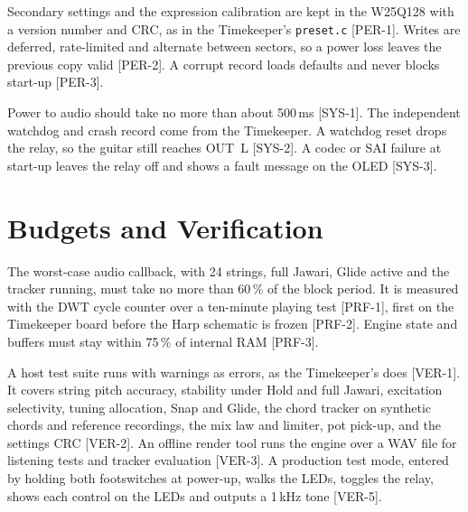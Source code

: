 Secondary settings and the expression calibration are kept in the W25Q128 with a version number and CRC, as in the Timekeeper's \texttt{preset.c} [PER-1]. Writes are deferred, rate-limited and alternate between sectors, so a power loss leaves the previous copy valid [PER-2]. A corrupt record loads defaults and never blocks start-up [PER-3].

Power to audio should take no more than about 500\,ms [SYS-1]. The independent watchdog and crash record come from the Timekeeper. A watchdog reset drops the relay, so the guitar still reaches OUT~L [SYS-2]. A codec or SAI failure at start-up leaves the relay off and shows a fault message on the OLED [SYS-3].

\section{Budgets and Verification}
The worst-case audio callback, with 24 strings, full Jawari, Glide active and the tracker running, must take no more than 60\,\% of the block period. It is measured with the DWT cycle counter over a ten-minute playing test [PRF-1], first on the Timekeeper board before the Harp schematic is frozen [PRF-2]. Engine state and buffers must stay within 75\,\% of internal RAM [PRF-3].

A host test suite runs with warnings as errors, as the Timekeeper's does [VER-1]. It covers string pitch accuracy, stability under Hold and full Jawari, excitation selectivity, tuning allocation, Snap and Glide, the chord tracker on synthetic chords and reference recordings, the mix law and limiter, pot pick-up, and the settings CRC [VER-2]. An offline render tool runs the engine over a WAV file for listening tests and tracker evaluation [VER-3]. A production test mode, entered by holding both footswitches at power-up, walks the LEDs, toggles the relay, shows each control on the LEDs and outputs a 1\,kHz tone [VER-5].
